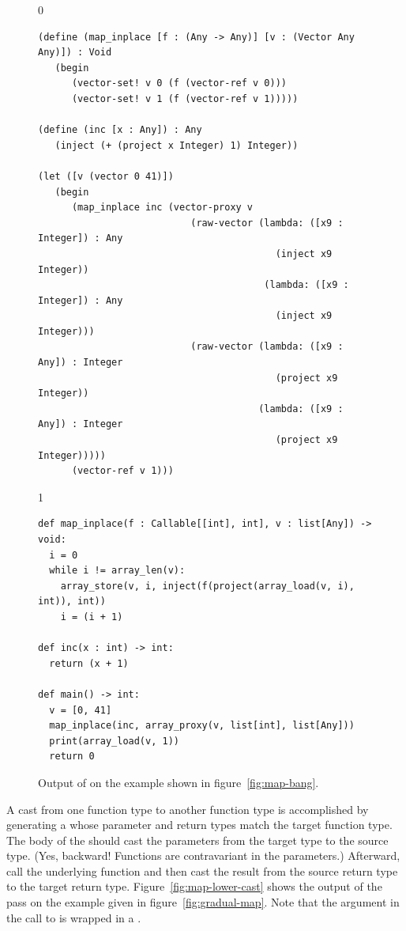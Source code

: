 \documentclass[7x10]{TimesAPriori_MIT}%
\def\racketEd{0}
\def\pythonEd{1}
\def\edition{1}
\newcommand{\pythonColor}[0]{}
\numberwithin{theorem}{chapter}
\numberwithin{definition}{chapter}
\numberwithin{equation}{chapter}
\begin{document}
\begin{figure}[tbp]
\begin{tcolorbox}[colback=white]  
{\if\edition\racketEd    
\begin{lstlisting}
(define (map_inplace [f : (Any -> Any)] [v : (Vector Any Any)]) : Void
   (begin 
      (vector-set! v 0 (f (vector-ref v 0)))
      (vector-set! v 1 (f (vector-ref v 1)))))
  
(define (inc [x : Any]) : Any
   (inject (+ (project x Integer) 1) Integer))

(let ([v (vector 0 41)])
   (begin 
      (map_inplace inc (vector-proxy v
                           (raw-vector (lambda: ([x9 : Integer]) : Any
                                          (inject x9 Integer))
                                        (lambda: ([x9 : Integer]) : Any
                                          (inject x9 Integer)))
                           (raw-vector (lambda: ([x9 : Any]) : Integer
                                          (project x9 Integer))
                                       (lambda: ([x9 : Any]) : Integer
                                          (project x9 Integer)))))
      (vector-ref v 1)))
\end{lstlisting}
\fi}
{\if\edition\pythonEd\pythonColor
\begin{lstlisting}[basicstyle=\ttfamily\footnotesize]
def map_inplace(f : Callable[[int], int], v : list[Any]) -> void:
  i = 0
  while i != array_len(v):
    array_store(v, i, inject(f(project(array_load(v, i), int)), int))
    i = (i + 1)

def inc(x : int) -> int:
  return (x + 1)

def main() -> int:
  v = [0, 41]
  map_inplace(inc, array_proxy(v, list[int], list[Any]))
  print(array_load(v, 1))
  return 0
\end{lstlisting}
\fi}
\end{tcolorbox}

\caption{Output of  on the example shown in
  figure~\ref{fig:map-bang}.}
\label{fig:map-bang-lower-cast}
\end{figure}

A cast from one function type to another function type is accomplished
by generating a  whose parameter and return types match
the target function type. The body of the  should cast
the parameters from the target type to the source type. (Yes,
backward! Functions are contravariant
in the parameters.) Afterward, call the underlying function and then
cast the result from the source return type to the target return type.
Figure~\ref{fig:map-lower-cast} shows the output of the
 pass on the  example given in
figure~\ref{fig:gradual-map}. Note that the  argument in the
call to  is wrapped in a .
\end{document}
